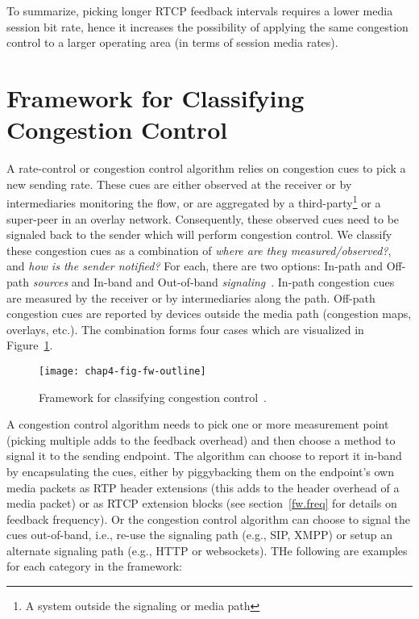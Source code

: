 To summarize, picking longer RTCP feedback intervals requires a lower media
session bit rate, hence it increases the possibility of applying the same
congestion control to a larger operating area (in terms of session media
rates).

\section{Framework for Classifying Congestion Control}
\label{fw.fw}

A rate-control or congestion control algorithm relies on congestion cues to
pick a new sending rate. These cues are either observed at the receiver or by
intermediaries monitoring the flow, or are aggregated by a
third-party\footnote{A system outside the signaling or media path} or a
super-peer in an overlay network. Consequently, these observed cues need to be
signaled back to the sender which will perform congestion control. We classify
these congestion cues as a combination of \emph{where are they
measured/observed?}, and \emph{how is the sender notified?} For each, there are
two options: In-path and Off-path \emph{sources} and In-band and Out-of-band 
\emph{signaling}~\cite{Singh:PhDFw}. In-path congestion cues are measured
by the receiver or by intermediaries along the path. Off-path congestion
cues are reported by devices outside the media path (congestion maps,
overlays, etc.). The combination forms four cases which are visualized in
Figure~\ref{fig:4:fw}.

\begin{figure}
\texttt{[image: chap4-fig-fw-outline]}
\caption{Framework for classifying congestion control~\cite{Singh:PhDFw}.}
\label{fig:4:fw}
\end{figure}

A congestion control algorithm needs to pick one or more measurement point
(picking multiple adds to the feedback overhead) and then choose a method
to signal it to the sending endpoint. The algorithm can choose to report it in-band by
encapsulating the cues, either by piggybacking them on the endpoint's own media
packets as RTP header extensions (this adds to the header overhead of a media
packet) or as RTCP extension blocks (see section~\ref{fw.freq} for details on
feedback frequency). Or the congestion control algorithm can choose to signal
the cues out-of-band, i.e., re-use the signaling path (e.g., SIP, XMPP) or
setup an alternate signaling path (e.g., HTTP or websockets). THe following are
examples for each category in the framework:

